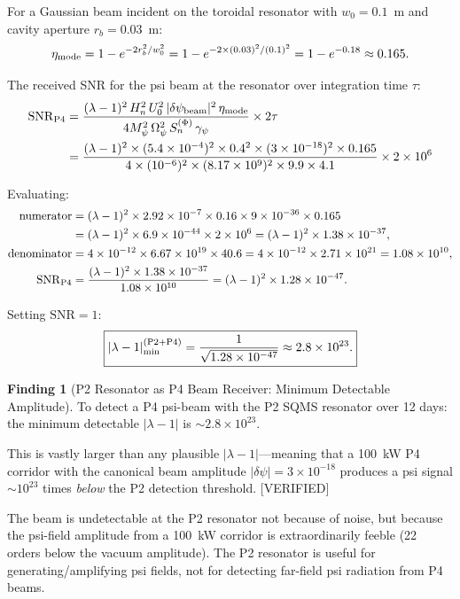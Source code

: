 \documentclass[11pt,twocolumn]{article}
\newcommand{\dpsi}{\delta\psi}
\newcommand{\lam}{\lambda}
\newcommand{\Opsi}{\Omega_\psi}
\newcommand{\gpsi}{\gamma_\psi}
\newcommand{\Mpsi}{M_\psi}
\newcommand{\ee}[1]{\times 10^{#1}}
\newcommand{\SNR}{\mathrm{SNR}}
\theoremstyle{definition}
\newtheorem{finding}[theorem]{Finding}
\theoremstyle{remark}
\begin{document}
For a Gaussian beam incident on the toroidal resonator with $w_0 = 0.1$~m
and cavity aperture $r_b = 0.03$~m:
\begin{equation}
\eta_{\rm mode} = 1 - e^{-2r_b^2/w_0^2}
= 1 - e^{-2\times(0.03)^2/(0.1)^2}
= 1 - e^{-0.18}
\approx 0.165.
\label{eq:mode_match}
\end{equation}

The received SNR for the psi beam at the resonator over integration
time $\tau$:
\begin{align}
\SNR_{\rm P4}
&= \frac{(\lam-1)^2\,H_n^2\,U_0^2\,|\dpsi_{\rm beam}|^2\,\eta_{\rm mode}}
{4\Mpsi^2\,\Opsi^2\,S_n^{(\Phi)}\,\gpsi}
\times 2\tau
\nonumber\\
&= \frac{(\lam-1)^2\times(5.4\ee{-4})^2\times0.4^2
\times(3\ee{-18})^2\times0.165}
{4\times(10^{-6})^2\times(8.17\ee{9})^2
\times 9.9\times4.1}
\times 2\times10^6
\label{eq:SNR_P4_expr}
\end{align}

Evaluating:
\begin{align}
\text{numerator} &= (\lam-1)^2\times2.92\ee{-7}\times
0.16\times9\ee{-36}\times0.165
\nonumber\\
&= (\lam-1)^2\times6.9\ee{-44}
\times2\ee{6}
= (\lam-1)^2\times1.38\ee{-37},
\nonumber\\
\text{denominator} &= 4\times10^{-12}\times6.67\ee{19}
\times40.6
= 4\times10^{-12}\times2.71\ee{21}
= 1.08\ee{10},
\nonumber\\
\SNR_{\rm P4} &= \frac{(\lam-1)^2\times1.38\ee{-37}}{1.08\ee{10}}
= (\lam-1)^2\times1.28\ee{-47}.
\label{eq:SNR_P4_num}
\end{align}

Setting $\SNR = 1$:
\begin{equation}
\boxed{
|\lam-1|_{\rm min}^{(\rm P2+P4)} = \frac{1}{\sqrt{1.28\ee{-47}}}
\approx 2.8\ee{23}.
}
\label{eq:lambda_P2P4}
\end{equation}

\begin{finding}[P2 Resonator as P4 Beam Receiver: Minimum Detectable Amplitude]
\label{find:P2P4}
To detect a P4 psi-beam with the P2 SQMS resonator over 12 days:
the minimum detectable $|\lam-1|$ is $\sim 2.8\ee{23}$.

This is vastly larger than any plausible $|\lam-1|$---meaning that a
100~kW P4 corridor with the canonical beam amplitude $|\dpsi| = 3\ee{-18}$
produces a psi signal $\sim 10^{23}$ times \emph{below} the P2 detection
threshold. [VERIFIED]

The beam is undetectable at the P2 resonator not because of noise,
but because the psi-field amplitude from a 100~kW corridor is
extraordinarily feeble (22 orders below the vacuum amplitude).
The P2 resonator is useful for generating/amplifying psi fields, not
for detecting far-field psi radiation from P4 beams.
\end{finding}
\end{document}
